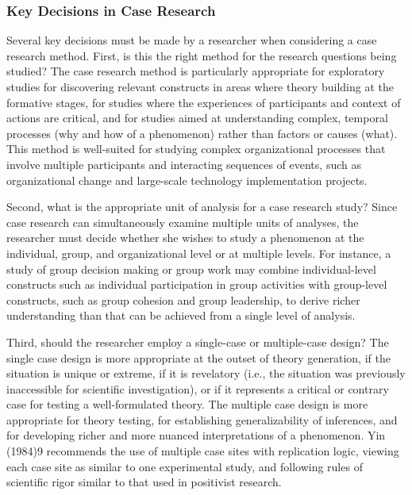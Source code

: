 \subsubsection{Key Decisions in Case Research}

Several key decisions must be made by a researcher when considering a case research method. First, is this the right method for the research questions being studied? The case research method is particularly appropriate for exploratory studies for discovering relevant constructs in areas where theory building at the formative stages, for studies where the experiences of participants and context of actions are critical, and for studies aimed at understanding complex, temporal processes (why and how of a phenomenon) rather than factors or causes (what). This method is well-suited for studying complex organizational processes that involve multiple participants and interacting sequences of events, such as organizational change and large-scale technology implementation projects.

Second, what is the appropriate unit of analysis for a case research study? Since case research can simultaneously examine multiple units of analyses, the researcher must decide whether she wishes to study a phenomenon at the individual, group, and organizational level or at multiple levels. For instance, a study of group decision making or group work may combine individual-level constructs such as individual participation in group activities with group-level constructs, such as group cohesion and group leadership, to derive richer understanding than that can be achieved from a single level of analysis.

Third, should the researcher employ a single-case or multiple-case design? The single case design is more appropriate at the outset of theory generation, if the situation is unique or extreme, if it is revelatory (i.e., the situation was previously inaccessible for scientific investigation), or if it represents a critical or contrary case for testing a well-formulated theory. The multiple case design is more appropriate for theory testing, for establishing generalizability of inferences, and for developing richer and more nuanced interpretations of a phenomenon. Yin (1984)9 recommends the use of multiple case sites with replication logic, viewing each case site as similar to one experimental study, and following rules of scientific rigor similar to that used in positivist research.

